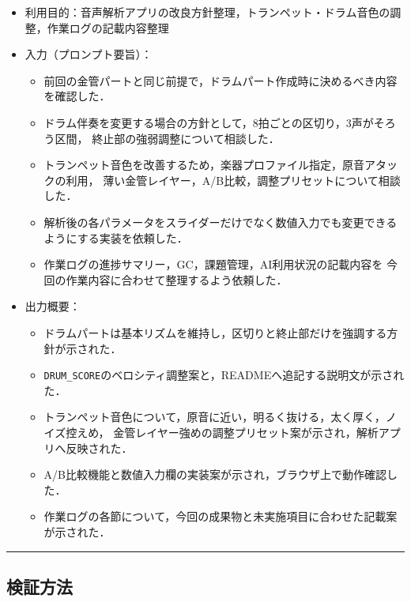 \documentclass[uplatex,dvipdfmx,a4paper,11pt]{jsarticle}
\newcommand{\sectionrule}{\par\medskip\noindent\rule{\linewidth}{0.6pt}\par\medskip}
\begin{document}
\begin{itemize}
  \item 利用目的：音声解析アプリの改良方針整理，トランペット・ドラム音色の調整，作業ログの記載内容整理
  \item 入力（プロンプト要旨）：
    \begin{itemize}
      \item {}前回の金管パートと同じ前提で，ドラムパート作成時に決めるべき内容を確認した．
      \item {}ドラム伴奏を変更する場合の方針として，8拍ごとの区切り，3声がそろう区間，
        終止部の強弱調整について相談した．
      \item {}トランペット音色を改善するため，楽器プロファイル指定，原音アタックの利用，
        薄い金管レイヤー，A/B比較，調整プリセットについて相談した．
      \item {}解析後の各パラメータをスライダーだけでなく数値入力でも変更できるようにする実装を依頼した．
      \item {}作業ログの進捗サマリー，GC，課題管理，AI利用状況の記載内容を
        今回の作業内容に合わせて整理するよう依頼した．
    \end{itemize}
  \item 出力概要：
    \begin{itemize}
      \item {}ドラムパートは基本リズムを維持し，区切りと終止部だけを強調する方針が示された．
      \item {}\texttt{DRUM\_SCORE}のベロシティ調整案と，READMEへ追記する説明文が示された．
      \item {}トランペット音色について，原音に近い，明るく抜ける，太く厚く，ノイズ控えめ，
        金管レイヤー強めの調整プリセット案が示され，解析アプリへ反映された．
      \item {}A/B比較機能と数値入力欄の実装案が示され，ブラウザ上で動作確認した．
      \item {}作業ログの各節について，今回の成果物と未実施項目に合わせた記載案が示された．
    \end{itemize}
\end{itemize}

\sectionrule

\subsection{検証方法}
\end{document}

